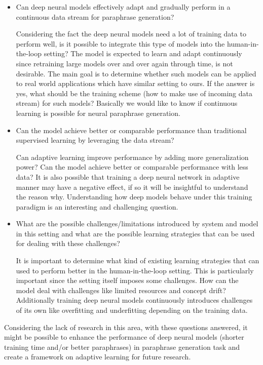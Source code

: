 \begin{itemize}
  \item Can deep neural models effectively adapt and gradually perform in a continuous data stream for paraphrase generation?

Considering the fact the deep neural models need a lot of training data to perform well, is it possible to integrate this type of models into the human-in-the-loop setting? The model is expected to learn and adapt continuously since retraining large models over and over again through time, is not desirable. The main goal is to determine whether such models can be applied to real world applications which have similar setting to ours. If the answer is yes, what should be the training scheme (how to make use of incoming data stream) for such models? Basically we would like to know if continuous learning is possible for neural paraphrase generation. 
 
  \item Can the model achieve better or comparable performance than traditional supervised learning by leveraging the data stream?
  
  Can adaptive learning improve performance by adding more generalization power? Can the model achieve better or comparable performance with less data? It is also possible that training a deep neural network in adaptive manner may have a negative effect, if so it will be insightful to understand the reason why. Understanding how deep models behave under this training paradigm is an interesting and challenging question.
   
  \item What are the possible challenges/limitations introduced by system and model in this setting and what are the possible learning strategies that can be used for dealing with these challenges?
  
  It is important to determine what kind of existing learning strategies that can used to perform better in the human-in-the-loop setting. This is particularly important since the setting itself imposes some challenges. How can the model deal with challenges like limited resources and concept drift? Additionally training deep neural models continuously introduces challenges of its own like overfitting and underfitting depending on the training data.

\end{itemize}

Considering the lack of research in this area, with these questions answered, it might be possible to enhance the performance of deep neural models (shorter training time and/or better paraphrases) in paraphrase generation task and create a framework on adaptive learning for future research.

